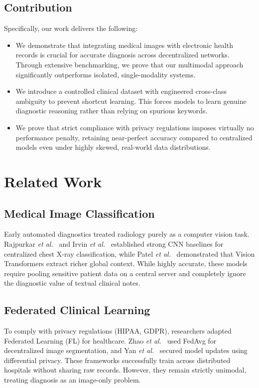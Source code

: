 \documentclass[letterpaper, conference]{IEEEtran}
\begin{document}
\subsection{Contribution}
Specifically, our work delivers the following:
\begin{itemize}
  \item We demonstrate that integrating medical images with electronic health records is crucial for accurate diagnosis across decentralized networks. Through extensive benchmarking, we prove that our multimodal approach significantly outperforms isolated, single-modality systems.
  \item We introduce a controlled clinical dataset with engineered cross-class ambiguity to prevent shortcut learning. This forces models to learn genuine diagnostic reasoning rather than relying on spurious keywords.
  \item We prove that strict compliance with privacy regulations imposes virtually no performance penalty, retaining near-perfect accuracy compared to centralized models even under highly skewed, real-world data distributions.
\end{itemize}

\section{Related Work}

\subsection{Medical Image Classification}
Early automated diagnostics treated radiology purely as a computer vision task. Rajpurkar \textit{et al.}~\cite{Rajpurkar2017} and Irvin \textit{et al.}~\cite{Irvin2019} established strong CNN baselines for centralized chest X-ray classification, while Patel \textit{et al.}~\cite{Akkaya2024} demonstrated that Vision Transformers extract richer global context. While highly accurate, these models require pooling sensitive patient data on a central server and completely ignore the diagnostic value of textual clinical notes.

\subsection{Federated Clinical Learning}
To comply with privacy regulations (HIPAA, GDPR), researchers adapted Federated Learning (FL) for healthcare. Zhao \textit{et al.}~\cite{Zhao2025} used FedAvg for decentralized image segmentation, and Yan \textit{et al.}~\cite{Yan2024} secured model updates using differential privacy. These frameworks successfully train across distributed hospitals without sharing raw records. However, they remain strictly unimodal, treating diagnosis as an image-only problem.
\end{document}
